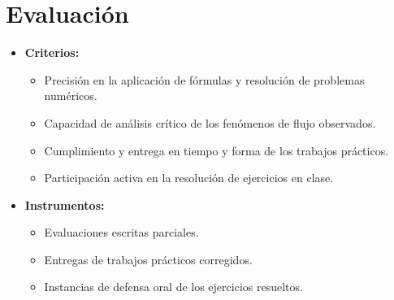 \section*{Evaluación}
\begin{itemize}[label=\textbullet]
    \item \textbf{Criterios:}
    \begin{itemize}
        \item Precisión en la aplicación de fórmulas y resolución de problemas numéricos.
        \item Capacidad de análisis crítico de los fenómenos de flujo observados.
        \item Cumplimiento y entrega en tiempo y forma de los trabajos prácticos.
        \item Participación activa en la resolución de ejercicios en clase.
    \end{itemize}
    \item \textbf{Instrumentos:}
    \begin{itemize}
        \item Evaluaciones escritas parciales.
        \item Entregas de trabajos prácticos corregidos.
        \item Instancias de defensa oral de los ejercicios resueltos.
    \end{itemize}
\end{itemize}